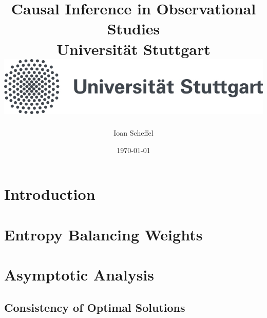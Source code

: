 \documentclass[11pt, a4paper, BCOR=10mm, DIV=11]{scrbook}
\title{
  {
    Causal Inference in Observational Studies
  }
  \\
  {\large Universität Stuttgart}
  \\
  {\includegraphics{unistuttgart_logo_deutsch.jpg}}
}
\author{Ioan Scheffel}
\date{\today}
\theoremstyle{definition}
\theoremstyle{plain}
\begin{document}

\maketitle

\tableofcontents 

%
%
\chapter{Introduction}

%
\chapter{Entropy Balancing Weights}
  
  \newpage
%  

  \chapter{Asymptotic Analysis}
  \section{Consistency of Optimal Solutions}
\end{document}
